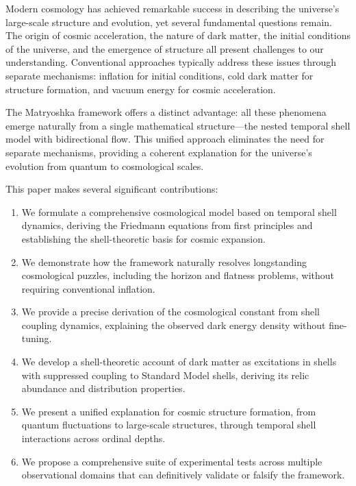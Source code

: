 \documentclass[12pt,a4paper]{article}
\begin{document}
Modern cosmology has achieved remarkable success in describing the universe's large-scale structure and evolution, yet several fundamental questions remain. The origin of cosmic acceleration, the nature of dark matter, the initial conditions of the universe, and the emergence of structure all present challenges to our understanding. Conventional approaches typically address these issues through separate mechanisms: inflation for initial conditions, cold dark matter for structure formation, and vacuum energy for cosmic acceleration.

The Matryoshka framework offers a distinct advantage: all these phenomena emerge naturally from a single mathematical structure—the nested temporal shell model with bidirectional flow. This unified approach eliminates the need for separate mechanisms, providing a coherent explanation for the universe's evolution from quantum to cosmological scales.

This paper makes several significant contributions:

\begin{enumerate}
    \item We formulate a comprehensive cosmological model based on temporal shell dynamics, deriving the Friedmann equations from first principles and establishing the shell-theoretic basis for cosmic expansion.
    
    \item We demonstrate how the framework naturally resolves longstanding cosmological puzzles, including the horizon and flatness problems, without requiring conventional inflation.
    
    \item We provide a precise derivation of the cosmological constant from shell coupling dynamics, explaining the observed dark energy density without fine-tuning.
    
    \item We develop a shell-theoretic account of dark matter as excitations in shells with suppressed coupling to Standard Model shells, deriving its relic abundance and distribution properties.
    
    \item We present a unified explanation for cosmic structure formation, from quantum fluctuations to large-scale structures, through temporal shell interactions across ordinal depths.
    
    \item We propose a comprehensive suite of experimental tests across multiple observational domains that can definitively validate or falsify the framework.
\end{enumerate}
\end{document}
